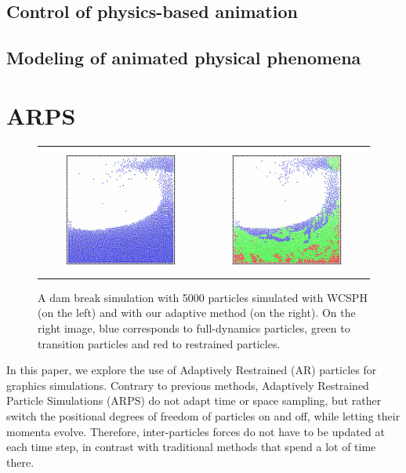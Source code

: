 \documentclass[11pt, oneside, a4paper]{memoir}
\begin{document}
\section{Control of physics-based animation}

\section{Modeling of animated physical phenomena}


\chapter{ARPS}

\begin{figure}[!h]
    \begin{tabular}{cc}
        \includegraphics[width=0.4\linewidth]{images/arps-vriphys2013/ReposSPHClassique1.jpg} &
        \includegraphics[width=0.4\linewidth]{images/arps-vriphys2013/ReposSPHARPSColor1.jpg}
    \end{tabular}
 \centering
 \caption{ A dam break simulation with 5000 particles simulated with WCSPH (on the left)
 and with our adaptive method (on the right). On the right image, blue corresponds to full-dynamics particles, green to transition particles and red to restrained particles.}
\label{fig:teaser}
\end{figure}

In this paper, we explore the use of Adaptively Restrained (AR) particles for graphics simulations. Contrary to previous methods,
Adaptively Restrained Particle Simulations (ARPS) do not adapt time or space sampling, but rather switch the positional degrees of freedom of particles on and off, while letting their momenta evolve. Therefore, inter-particles forces do not have to be updated at each time step, in contrast with traditional methods that spend a lot of time there.
\end{document}
